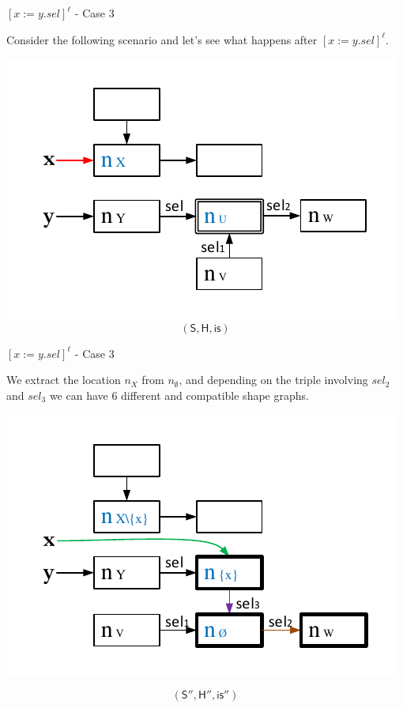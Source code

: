 \documentclass[xcolor=svgnames,11pt]{beamer}
\begin{document}
\begin{frame}{$[x:=y.sel]^\ell$ - Case 3}

Consider the following scenario and let's see what happens after $[x:=y.sel]^\ell$.

\includegraphics[page=3]{../figures/fig7.pdf}
$$\mathsf{(S,H,is)}$$

\end{frame}

\begin{frame}{$[x:=y.sel]^\ell$ - Case 3}

We extract the location $n_X$ from $n_\emptyset$, and depending on the triple involving $sel_2$ and $sel_3$ we can have 6 different and compatible shape graphs.

\includegraphics[page=7]{../figures/fig8.pdf}

$$\mathsf{(S'',H'',is'')}$$
\end{frame}
\end{document}
